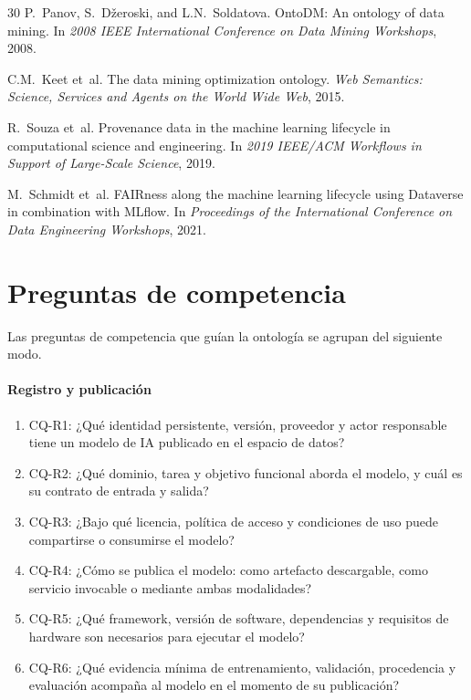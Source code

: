 \documentclass[11pt,a4paper]{article}
\newcommand{\cq}[1]{\textsf{#1}}
\begin{document}
\begin{thebibliography}{30}
 P.~Panov, S.~Džeroski, and L.N.~Soldatova. OntoDM: An ontology of data mining. In \emph{2008 IEEE International Conference on Data Mining Workshops}, 2008.

 C.M.~Keet et~al. The data mining optimization ontology. \emph{Web Semantics: Science, Services and Agents on the World Wide Web}, 2015.

 R.~Souza et~al. Provenance data in the machine learning lifecycle in computational science and engineering. In \emph{2019 IEEE/ACM Workflows in Support of Large-Scale Science}, 2019.

 M.~Schmidt et~al. FAIRness along the machine learning lifecycle using Dataverse in combination with MLflow. In \emph{Proceedings of the International Conference on Data Engineering Workshops}, 2021.

\end{thebibliography}

\appendix

\section{Preguntas de competencia}

Las preguntas de competencia que guían la ontología se agrupan del siguiente modo.

\paragraph{Registro y publicación}
\begin{enumerate}[label=\arabic*., leftmargin=*]
\item \cq{CQ-R1}: ¿Qué identidad persistente, versión, proveedor y actor responsable tiene un modelo de IA publicado en el espacio de datos?
\item \cq{CQ-R2}: ¿Qué dominio, tarea y objetivo funcional aborda el modelo, y cuál es su contrato de entrada y salida?
\item \cq{CQ-R3}: ¿Bajo qué licencia, política de acceso y condiciones de uso puede compartirse o consumirse el modelo?
\item \cq{CQ-R4}: ¿Cómo se publica el modelo: como artefacto descargable, como servicio invocable o mediante ambas modalidades?
\item \cq{CQ-R5}: ¿Qué framework, versión de software, dependencias y requisitos de hardware son necesarios para ejecutar el modelo?
\item \cq{CQ-R6}: ¿Qué evidencia mínima de entrenamiento, validación, procedencia y evaluación acompaña al modelo en el momento de su publicación?
\end{enumerate}
\end{document}
